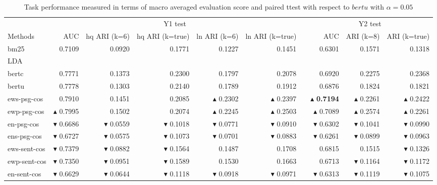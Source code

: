 \documentclass[sigconf,authordraft]{acmart}
\begin{document}
\begin{table}[t]
\centering
\caption{Task performance measured in terms of macro averaged evaluation score and paired ttest with respect to $bertu$ with $\alpha = 0.05$}
\label{tab:by1}
\begin{tabular}{@{}lrrrrrrrrr@{}}\toprule
& \multicolumn{5}{c}{Y1 test} && \multicolumn{3}{c}{Y2 test}  \\
\cmidrule(r){2-6}
\cmidrule(r){8-10}
Methods & AUC & hq ARI (k=6) & hq ARI (k=true) & ln ARI (k=6) & ln ARI (k=true) && AUC & ARI (k=8) & ARI (k=true) \\\midrule
bm25 & 0.7109 & 0.0920 & 0.1771 & 0.1227 & 0.1451 && 0.6301 & 0.1571 & 0.1318 \\
LDA & & & & & && & & \\
bertc & 0.7771 & 0.1373 & 0.2300 & 0.1797 & 0.2078 && 0.6920 & 0.2275 & 0.2368 \\ 
bertu & 0.7778 & 0.1303 & 0.2140 & 0.1789 & 0.1912 && 0.6876 & 0.1824 & 0.1821 \\\midrule
ews-psg-cos & 0.7910 & 0.1451 & 0.2085 & $\blacktriangle$ 0.2302 & $\blacktriangle$ 0.2397 && $\blacktriangle$ \textbf{0.7194} & $\blacktriangle$ 0.2261 & $\blacktriangle$ 0.2422 \\ 
ewp-psg-cos & $\blacktriangle$ 0.7995 & 0.1502 & 0.2074 & $\blacktriangle$ 0.2245 & $\blacktriangle$ 0.2503 && $\blacktriangle$ 0.7089 & $\blacktriangle$ 0.2574 & $\blacktriangle$ 0.2261 \\ 
en-psg-cos & $\blacktriangledown$ 0.6686 & $\blacktriangledown$ 0.0559 & $\blacktriangledown$ 0.1018 & $\blacktriangledown$ 0.0771 & $\blacktriangledown$ 0.0910 && $\blacktriangledown$ 0.6302 & $\blacktriangledown$ 0.1041 & $\blacktriangledown$ 0.0990 \\ 
ens-psg-cos & $\blacktriangledown$ 0.6727 & $\blacktriangledown$ 0.0575 & $\blacktriangledown$ 0.1073 & $\blacktriangledown$ 0.0701 & $\blacktriangledown$ 0.0883 && $\blacktriangledown$ 0.6261 & $\blacktriangledown$ 0.0899 & $\blacktriangledown$ 0.0963 \\\midrule
ews-sent-cos & $\blacktriangledown$ 0.7379 & $\blacktriangledown$ 0.0882 & $\blacktriangledown$ 0.1564 & 0.1487 & 0.1708 && 0.6815 & 0.1515 & $\blacktriangledown$ 0.1326 \\ 
ewp-sent-cos & $\blacktriangledown$ 0.7350 & $\blacktriangledown$ 0.0951 & $\blacktriangledown$ 0.1589 & 0.1530 & 0.1663 && 0.6713 & $\blacktriangledown$ 0.1164 & $\blacktriangledown$ 0.1172 \\ 
en-sent-cos & $\blacktriangledown$ 0.6629 & $\blacktriangledown$ 0.0644 & $\blacktriangledown$ 0.1118 & $\blacktriangledown$ 0.0918 & $\blacktriangledown$ 0.0971 && $\blacktriangledown$ 0.6313 & $\blacktriangledown$ 0.1119 & $\blacktriangledown$ 0.1075 \\ 

\end{tabular}
\end{table}
\end{document}
